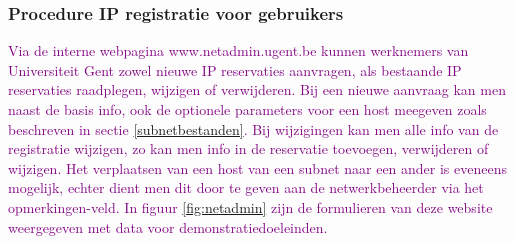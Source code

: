 \subsubsection{Procedure IP registratie voor gebruikers}
\textcolor{purple}{Via de interne webpagina www.netadmin.ugent.be kunnen werknemers van Universiteit Gent zowel nieuwe IP reservaties aanvragen, als bestaande IP reservaties raadplegen, wijzigen of verwijderen. Bij een nieuwe aanvraag kan men naast de basis info, ook de optionele parameters voor een host meegeven zoals beschreven in sectie \ref{subnetbestanden}. Bij wijzigingen kan men alle info van de registratie wijzigen, zo kan men info in de reservatie toevoegen, verwijderen of wijzigen. Het verplaatsen van een host van een subnet naar een ander is eveneens mogelijk, echter dient men dit door te geven aan de netwerkbeheerder via het opmerkingen-veld. In figuur \ref{fig:netadmin} zijn de formulieren van deze website weergegeven met data voor demonstratiedoeleinden.
}
\clearpage
{}


